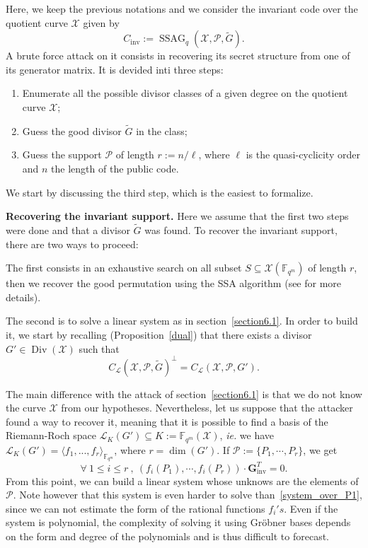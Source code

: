 \documentclass[10pt]{article}
\theoremstyle{definition}
\theoremstyle{definition}
\theoremstyle{definition}
\newcommand{\cd}{\cdot}
\newcommand{\Fqm}{\mathbb{F}_{q^m}}
\newcommand{\su}{\subseteq}
\newcommand{\X}{\mathcal{X}}
\newcommand{\PR}{\mathcal{P}}
\newcommand{\Div}{\operatorname{Div}}
\newcommand{\ssag}{\operatorname{SSAG}}
\newcommand{\calL}{\mathcal{L}}
\begin{document}
Here, we keep the previous notations and we consider the invariant code over the quotient curve $\X$ given by
\[C_{\mathrm{inv}} := \ssag_q(\X,\PR,\tilde{G}).\]
A brute force attack on it consists in recovering its secret structure from one of its generator matrix. It is devided inti three steps:
\begin{enumerate}
\item Enumerate all the possible divisor classes of a given degree on the quotient curve $\X$;
\item Guess the good divisor $\tilde{G}$ in the class;
\item Guess the support $\PR$ of length $r:=n/\ell$, where $\ell$ is the quasi-cyclicity order and $n$ the length of the public code.
\end{enumerate}

We start by discussing the third step, which is the easiest to formalize. 



 \textbf{Recovering the invariant support.} Here we assume that the first two steps were done and that a divisor $\tilde{G}$ was found. To recover the invariant support, there are two ways to proceed: 



 The first consists in an exhaustive search on all subset $S \su \X(\Fqm)$ of length $r$, then we recover the good permutation using the SSA algorithm (see \cite{SSA} for more details). 



 The second is to solve a linear system as in section~\ref{section6.1}. In order to build it, we start by recalling (Proposition~\ref{dual}) that there exists a divisor $G' \in  \Div(\X)$ such that 
\[ C_{\calL}(\X,\PR,\tilde{G})^{\perp} = C_{\calL}(\X,\PR,G').\]

 The main difference with the attack of section~\ref{section6.1} is that we do not know the curve $\X$ from our hypotheses. Nevertheless, let us suppose that the attacker found a way to recover it, meaning that it is possible to find a basis of the Riemann-Roch space $\calL_K(G') \su K:=\Fqm(\X)$, \textit{ie.} we have $\calL_K(G') = \langle f_1,...,f_r \rangle_{\Fqm}$, where $r = \dim(G')$. If $\PR := \{P_1,\cdots,P_r\}$, we get 
\begin{equation*}
\forall \ 1 \leq i \leq r \ , \ (f_i(P_1),\cdots,f_i(P_r)) \cd \mathbf{G}_{\mathrm{inv}}^T = 0.
\end{equation*}
From this point, we can build a linear system whose unknows are the elements of $\PR$.
Note however that this system is even harder to solve than~\eqref{system_over_P1}, since we can not estimate the form of the rational functions $f_i's$. Even if the system is polynomial, the complexity of solving it using Gröbner bases depends on the form and degree of the polynomials and is thus difficult to forecast.
\end{document}
